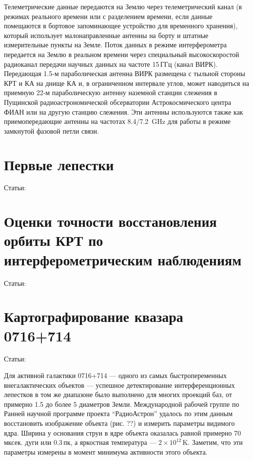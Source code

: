 Телеметрические данные передаются на Землю
через телеметрический канал (в режимах реального
времени или с разделением времени, если данные
помещаются в бортовое запоминающее устройство
для временного хранения), который использует
малонаправленные антенны на борту и штатные
измерительные пункты на Земле. Поток данных
в режиме интерферометра передается на Землю
в реальном времени через специальный высокоскоростой радиоканал передачи научных данных
на частоте 15\,ГГц (канал ВИРК). Передающая
1.5-м параболическая антенна ВИРК размещена
с тыльной стороны КРТ и КА на днище КА и, в
ограниченном интервале углов, может наводиться
на приемную 22-м параболическую антенну наземной станции слежения в Пущинской радиоастрономической
обсерватории Астрокосмического центра ФИАН или на другую станцию слежения.
Эти антенны используются также как приемопередающие антенны на частотах
\num{8.4}/\SI{7.2}{\giga\hertz} для работы в режиме замкнутой фазовой петли связи.



\section{Первые лепестки}

Статьи: \cite{Kardashev_2013_rus}



\section{Оценки точности восстановления орбиты КРТ по интерферометрическим наблюдениям}

Статьи: \cite{Lobanov_2015,Zakhvatkin_2018}

\section{Картографирование квазара 0716+714}

Статьи: \cite{Kardashev_2013_rus}

Для активной галактики 0716+714 --- одного из
самых быстропеременных внегалактических объектов --- успешное детектирование интерференционных
лепестков в том же диапазоне было выполнено для многих проекций баз, от примерно 1.5 до
более 5 диаметров Земли. Международной рабочей группе по Ранней научной программе проекта
“РадиоАстрон” удалось по этим данным восстановить изображение объекта (рис. ??) и измерить
параметры видимого ядра. Ширина у основания
струи в ядре объекта оказалась равной примерно
70 мксек. дуги или 0.3\,пк, а яркостная температура --- $2 \times 10^{12}\,\text{K}$. Заметим, что
эти параметры измерены в момент минимума активности этого объекта.
